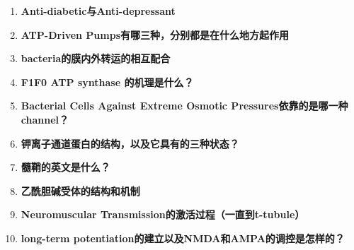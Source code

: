 \documentclass[12pt,fontset=none]{ctexart}
\begin{document}
\begin{enumerate}
\item \textbf{Anti-diabetic与Anti-depressant}

\item \textbf{ATP-Driven Pumps有哪三种，分别都是在什么地方起作用}

\item \textbf{bacteria的膜内外转运的相互配合}

\item \textbf{F1F0 ATP synthase 的机理是什么？}

\item \textbf{Bacterial Cells Against Extreme Osmotic Pressures依靠的是哪一种channel？}

\item \textbf{钾离子通道蛋白的结构，以及它具有的三种状态？}

\item \textbf{髓鞘的英文是什么？}

\item \textbf{乙酰胆碱受体的结构和机制}

\item \textbf{Neuromuscular Transmission的激活过程（一直到t-tubule）}

\item \textbf{long-term potentiation的建立以及NMDA和AMPA的调控是怎样的？}

\end{enumerate}



\end{document}
